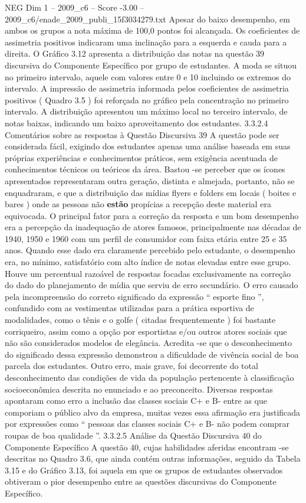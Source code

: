 \begin{textsample}{NEG Dim 1 – 2009\_c6 – Score -3.00 – 2009\_c6/enade\_2009\_publi\_15f3034279.txt}
Apesar do baixo desempenho, em ambos os grupos a nota máxima de 100,0 pontos foi alcançada.
Os coeficientes de assimetria positivos indicaram uma inclinação para a esquerda e cauda para a direita.
O Gráfico 3.12 apresenta a distribuição das notas na questão 39 discursiva do Componente Específico por grupo de estudantes.
A moda se situou no primeiro intervalo, aquele com valores entre 0 e 10 incluindo os extremos do intervalo.
A impressão de assimetria informada pelos coeficientes de assimetria positivos ( Quadro 3.5 ) foi reforçada no gráfico pela concentração no primeiro intervalo.
A distribuição apresentou um máximo local no terceiro intervalo, de notas baixas, indicando um baixo aproveitamento dos estudantes. 3.3.2.4 Comentários sobre as respostas à Questão Discursiva 39 A questão pode ser considerada fácil, exigindo dos estudantes apenas uma análise baseada em suas próprias experiências e conhecimentos práticos, sem exigência acentuada de conhecimentos técnicos ou teóricos da área.
Bastou -se perceber que os ícones apresentados representaram outra geração, distinta e almejada, portanto, não se enquadraram, e que a distribuição das mídias flyers e folders em locais ( boites e bares ) onde as pessoas não \textbf{estão} propícias a recepção deste material era equivocada.
O principal fator para a correção da resposta e um bom desempenho era a percepção da inadequação de atores famosos, principalmente nas décadas de 1940, 1950 e 1960 com um perfil de consumidor com faixa etária entre 25 e 35 anos.
Quando esse dado era claramente percebido pelo estudante, o desempenho era, no mínimo, satisfatório com alto índice de notas elevadas entre esse grupo.
Houve um percentual razoável de respostas focadas exclusivamente na correção do dado do planejamento de mídia que serviu de erro secundário.
O erro causado pela incompreensão do correto significado da expressão “ esporte fino ”, confundido com as vestimentas utilizadas para a prática esportiva de modalidades, como o tênis e o golfe ( citadas frequentemente ) foi bastante corriqueiro, assim como a opção por esportistas e/ou outros atores sociais que não são considerados modelos de elegância.
Acredita -se que o desconhecimento do significado dessa expressão demonstrou a dificuldade de vivência social de boa parcela dos estudantes.
Outro erro, mais grave, foi decorrente do total desconhecimento das condições de vida da população pertencente à classificação socioeconômica descrita no enunciado e ao preconceito.
Diversas respostas apontaram como erro a inclusão das classes sociais C+ e B- entre as que comporiam o público alvo da empresa, muitas vezes essa afirmação era justificada por expressões como “ pessoas das classes sociais C+ e B- não podem comprar roupas de boa qualidade ”. 3.3.2.5 Análise da Questão Discursiva 40 do Componente Específico A questão 40, cujas habilidades aferidas encontram -se descritas no Quadro 3.6, que ainda contém outras informações, seguido da Tabela 3.15 e do Gráfico 3.13, foi aquela em que os grupos de estudantes observados obtiveram o pior desempenho entre as questões discursivas do Componente Específico.

\end{textsample}
